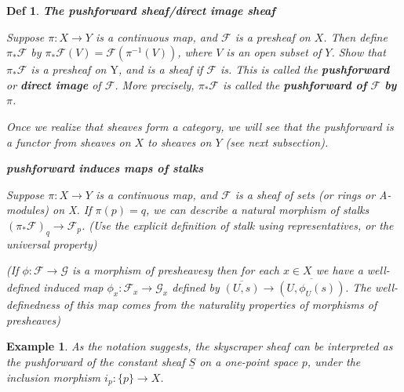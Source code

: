 \documentclass{article}
\newtheorem{definition}[theorem]{Def}
\newtheorem{example}[theorem]{Example}
\begin{document}
\begin{definition}
     \textbf{The pushforward sheaf/direct image sheaf}
     
     Suppose $\pi: X \rightarrow Y$ is a continuous map, and $\mathcal{F}$ is a presheaf on $X$. Then define $\pi_{*} \mathcal{F}$ by $\pi_{*} \mathcal{F}(V)=\mathcal{F}\left(\pi^{-1}(V)\right)$, where $V$ is an open subset of $Y$. Show that $\pi_{*} \mathcal{F}$ is a presheaf on $\mathrm{Y}$, and is a sheaf if $\mathcal{F}$ is. This is called the \textbf{pushforward} or \textbf{direct image} of $\mathcal{F}$. More precisely, $\pi_{*} \mathcal{F}$ is called the \textbf{pushforward of} $\mathcal{F}$ \textbf{by} $\pi$.

     Once we realize that sheaves form a category, we will see that the pushforward is a functor from sheaves on $X$ to sheaves on $Y$ (see next subsection).

      \textbf{pushforward induces maps of stalks}
      
      Suppose $\pi: X \rightarrow Y$ is a continuous map, and $\mathcal{F}$ is a sheaf of sets (or rings or A-modules) on X. If $\pi(p)=q$, we can describe a natural morphism of stalks $\left(\pi_{*} \mathcal{F}\right)_{q} \rightarrow \mathcal{F}_{p}$. (Use the explicit definition of stalk using representatives, or the universal property)

      (If $\phi:{\mathcal{F}} \rightarrow{\mathcal{G}}$ is a morphism of presheavesy then for each $x\in X$ we have a well-defined induced map $\phi_{x}:{\mathcal{F}}_{x}\to{\mathcal{G}}_{x}$ defined by $\overline{(U,s)}\rightarrow\overline{(U,\phi_{U}(s))}.$ The well-definedness of this map comes from the naturality properties of morphisms of presheaves)
\end{definition}
\begin{example}
As the notation suggests, the skyscraper sheaf can be interpreted as the pushforward of the constant sheaf $\underline{S}$ on a one-point space $p$, under the inclusion morphism $i_{p}:\{p\} \rightarrow X$.
\end{example}




\newpage
\end{document}
